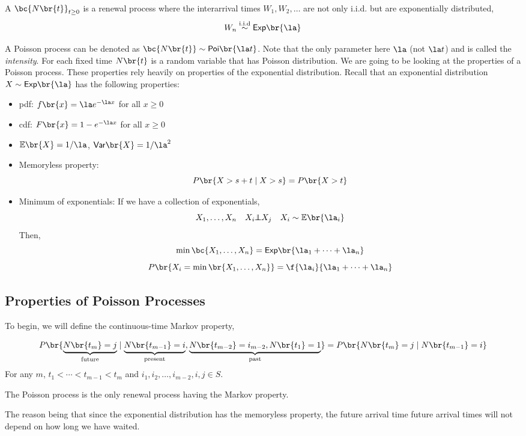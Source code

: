 \documentclass{article}
\newcommand{\indep}{\!\!\perp\!\!\!\!\perp\!\!}
\newcommand{\Var}{\textsf{Var}}
\newcommand{\Exp}{\mathbb{E}}
\newcommand{\Poi}{\mathsf{Poi}}
\newcommand{\Ex}{\mathsf{Exp}}
\begin{document}
    \begin{definition}
        A  $\bc{N\br{t}}_{t \geq 0}$ is a renewal process where the interarrival times $W_1, W_2, \ldots$ are not only i.i.d. but are exponentially distributed,
        \[ W_n \stackrel{\text{i.i.d}}{\sim} \Ex\br{\la} \]
    \end{definition}
    A Poisson process can be denoted as $\bc{N\br{t}} \sim \Poi\br{\la t}$. Note that the only parameter here $\la$ (not $\la t$) and is called the \textit{intensity}. For each fixed time $N\br{t}$ is a random variable that has Poisson distribution. We are going to be looking at the properties of a Poisson process. These properties rely heavily on properties of the exponential distribution. Recall that an exponential distribution $X \sim \Ex\br{\la}$ has the following properties:
    \begin{itemize}
        \item pdf: $f\br{x} = \la e^{-\la x}$ for all $x \geq 0$
        \item cdf: $F\br{x} = 1 - e^{-\la x}$ for all $x \geq 0$
        \item $\Exp\br{X} = 1 / \la$, $\Var\br{X} = 1 / \la^2$
        \item Memoryless property:
        \[ P\br{X > s + t \mid X > s} = P\br{X > t} \]
        \item Minimum of exponentials: If we have a collection of exponentials,
        \[ X_1, \ldots, X_n \quad X_i \indep X_j \quad X_i \sim \Exp\br{\la_i} \]
        Then,
        \[ \min\bc{X_1, \ldots, X_n} = \Ex\br{\la_1 + \cdots + \la_n} \]
        \[ P\br{X_i = \min\br{X_1, \ldots, X_n}} = \f{\la_i}{ \la_1 + \cdots + \la_n} \]
    \end{itemize}

    \subsection{Properties of Poisson Processes}
    To begin, we will define the continuous-time Markov property,
    \begin{definition}
         \label{def:ctmp}
        \[ P\br{\underbrace{N\br{t_m} = j}_{\text{future}} \mid \underbrace{N\br{t_{m-1}} = i}_{\text{present}}, \underbrace{N\br{t_{m-2}} = i_{m-2}, N\br{t_{1}} = 1}_{\text{past}}} = P\br{N\br{t_{m}} = j \mid N\br{t_{m-1}} = i} \]
        For any $m$, $t_1 < \cdots < t_{m-1} < t_m$ and $i_1, i_2, \ldots, i_{m-2}, i, j \in S$.
    \end{definition}
    \begin{theorem}
        The Poisson process is the only renewal process having the Markov property.
    \end{theorem}
    The reason being that since the exponential distribution has the memoryless property, the future arrival time future arrival times will not depend on how long we have waited.
\end{document}
